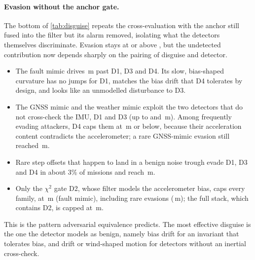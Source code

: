 \paragraph{Evasion without the anchor gate.}
The bottom of \cref{tab:disguise} repeats the cross-evaluation with the anchor
still fused into the filter but its alarm removed, isolating what the detectors
themselves discriminate. Evasion stays at or above \nNgEvMin{}, but the
undetected contribution now depends sharply on the pairing of disguise and
detector.
\begin{itemize}
\item The fault mimic drives \nNgDOneFaultMimic{}\,m past D1, D3 and D4. Its slow,
  bias-shaped curvature has no jumps for D1, matches the bias drift that D4
  tolerates by design, and looks like an unmodelled disturbance to D3.
\item The GNSS mimic and the weather mimic exploit the two detectors that do
  not cross-check the IMU, D1 and D3 (up to \nNgDOneGnssMimic{} and
  \nNgDOneWeatherMimic\,m). Among frequently evading attackers, D4 caps them at
  \nNgDFourWeatherMimic\,m or below, because their acceleration content
  contradicts the accelerometer; a rare GNSS-mimic evasion still reached
  \nNgDFourGnssUnf\,m.
\item Rare step offsets that happen to land in a benign noise trough evade D1,
  D3 and D4 in about 3\% of missions and reach \nNgStepUnfMax\,m.
\item Only the $\chi^2$ gate D2, whose filter models the accelerometer bias,
  caps every family, at \nNgCapDTwo\,m (fault mimic), including rare evasions
  (\nNgDTwoUnfMax\,m); the full stack, which contains D2, is capped at
  \nNgCapALL\,m.
\end{itemize}
This is the pattern adversarial equivalence predicts. The most effective
disguise is the one the detector models as benign, namely bias drift for an
invariant that tolerates bias, and drift or wind-shaped motion for detectors
without an inertial cross-check.

